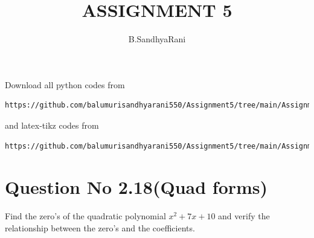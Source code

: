 \documentclass[journal,12pt,twocolumn]{IEEEtran}
\begin{document}
     \def\rightbox#1{\makebox[0in][r]{#1}}
     \def\centbox#1{\makebox[0in]{#1}}
     \def\topbox#1{\raisebox{-\baselineskip}[0in][0in]{#1}}
     \def\midbox#1{\raisebox{-0.5\baselineskip}[0in][0in]{#1}}
\vspace{3cm}
\title{ASSIGNMENT 5}
\author{B.SandhyaRani}
\maketitle
\newpage
\bigskip
\renewcommand{\thefigure}{\theenumi}
\renewcommand{\thetable}{\theenumi}
Download all python codes from 
\begin{lstlisting}
https://github.com/balumurisandhyarani550/Assignment5/tree/main/Assignment5
\end{lstlisting}
%
and latex-tikz codes from 
%
\begin{lstlisting}
https://github.com/balumurisandhyarani550/Assignment5/tree/main/Assignment5
\end{lstlisting}
%
\section{Question No 2.18(Quad forms)}
Find the zero's of the quadratic polynomial $x^2+7x+10$ and verify the relationship between the zero's and the coefficients. 
%
\end{document}
